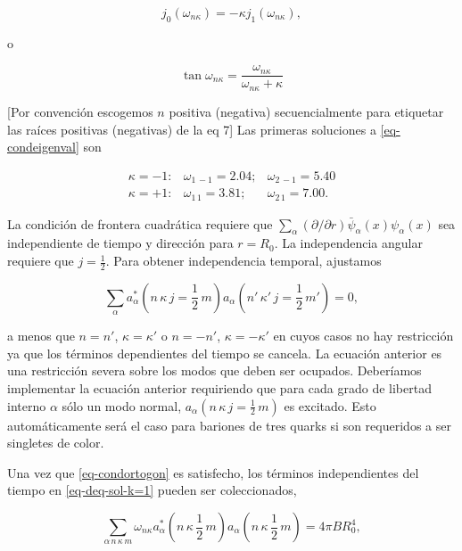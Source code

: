 $$
{j}_{0}({\omega}_{n \kappa}) = - \kappa {j}_{1} ({\omega}_{n \kappa}),
$$

o 

\begin{equation}\label{eq-condeigenval}
\tan {\omega}_{n \kappa} = \frac{{\omega}_{n \kappa}}{{\omega}_{n \kappa} + \kappa}
\end{equation}

[Por convención escogemos $n$ positiva (negativa) secuencialmente para etiquetar las raíces positivas (negativas) de la eq 7] Las primeras soluciones a \eqref{eq-condeigenval} son 

\begin{equation}\label{eq-deq-sols}
\begin{array}{ccc}
\kappa = - 1: & {\omega}_{1 \, -1} = 2.04; & {\omega}_{2 \, -1} = 5.40 \\
\kappa = + 1: & {\omega}_{1 \, 1} = 3.81; & {\omega}_{2 \, 1} = 7.00.
\end{array}
\end{equation}

La condición de frontera cuadrática requiere que $\sum_{\alpha} (\partial / \partial r) \bar{\psi}_{\alpha} (x) {\psi}_{\alpha}(x)$ sea independiente de tiempo y dirección para $r={R}_{0}$. La independencia angular requiere que $j = \frac{1}{2}$. Para obtener independencia temporal, ajustamos

\begin{equation}\label{eq-condortogon}
\sum_{\alpha} {a}_{\alpha}^{*} (n \, \kappa \, j= \frac{1}{2} \, m) {a}_{\alpha} (n' \, \kappa' \, j= \frac{1}{2} \, m') = 0,
\end{equation}

a menos que $n = n'$, $\kappa = \kappa'$ o $n = -n'$, $\kappa = -\kappa'$ en cuyos casos no hay restricción ya que los términos dependientes del tiempo se cancela. La ecuación anterior es una restricción severa sobre los modos que deben ser ocupados. Deberíamos implementar la ecuación anterior requiriendo que para cada grado de libertad interno $\alpha$ sólo un modo normal, ${a}_{\alpha}(n \, \kappa \, j = \frac{1}{2} \, m)$ es excitado. Esto automáticamente será el caso para bariones de tres quarks si son requeridos a ser singletes de color.

Una vez que \eqref{eq-condortogon} es satisfecho, los términos independientes del tiempo en \eqref{eq-deq-sol-k=1} pueden ser coleccionados,

\begin{equation}
\sum_{\alpha \, n \, \kappa \, m} {\omega}_{n \kappa} {a}_{\alpha}^{*}(n \, \kappa \, \frac{1}{2} \, m) {a}_{\alpha}(n \, \kappa \, \frac{1}{2} \, m) = 4 \pi B {R}_{0}^{4},
\end{equation}

